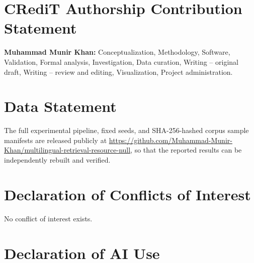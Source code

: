 \documentclass{ijimai_article}
\begin{document}
\section{CRediT Authorship Contribution Statement}

\textbf{Muhammad Munir Khan:} Conceptualization, Methodology, Software,
Validation, Formal analysis, Investigation, Data curation, Writing -- original
draft, Writing -- review and editing, Visualization, Project administration.

\section{Data Statement}

The full experimental pipeline, fixed seeds, and SHA-256-hashed corpus sample
manifests are released publicly at
\url{https://github.com/Muhammad-Munir-Khan/multilingual-retrieval-resource-null},
so that the reported results can be independently rebuilt and verified.

\section{Declaration of Conflicts of Interest}

No conflict of interest exists.

\section{Declaration of AI Use}
\end{document}
